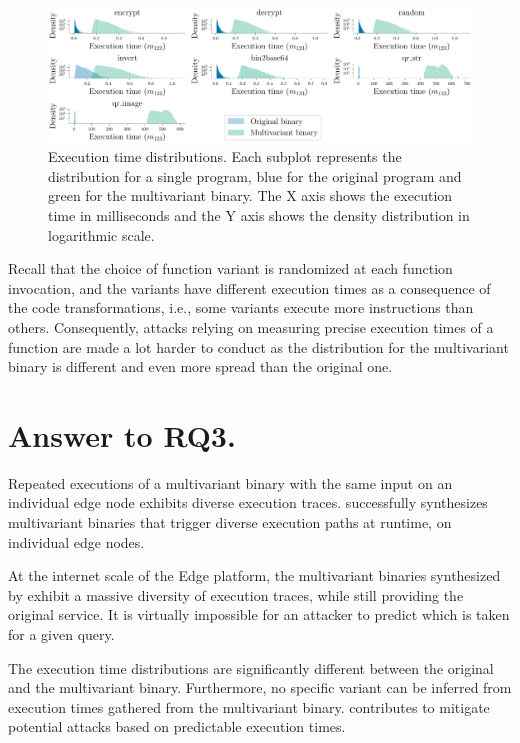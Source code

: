 \begin{figure}[h]
    \includegraphics[width=\linewidth]{plots/times.pdf}
    \caption{Execution time distributions. Each subplot represents the distribution for a single program, blue for the original program and green for the multivariant binary. The X axis shows the execution time in milliseconds and the Y axis shows the density distribution in logarithmic scale.}
    \label{rq3:diversity:times}
\end{figure}


Recall that the choice of function variant is randomized at each function invocation, and the variants have different execution times as a consequence of the code transformations, i.e., some variants execute more instructions than others. 
Consequently, attacks relying on measuring precise execution times of a function are made a lot harder to conduct as the distribution for the multivariant binary is different and even more spread than the original one.

\section{Answer to RQ3.}


Repeated executions of a multivariant binary with the same input on an individual edge node exhibits diverse execution traces.
\tool successfully synthesizes multivariant binaries that trigger diverse execution paths at runtime, on individual edge nodes. 


At the internet scale of the Edge platform, the multivariant binaries synthesized by \tool exhibit a massive diversity of execution traces, while still providing the original service.
It is virtually impossible for an attacker to predict which is taken for a given query.



The execution time distributions are significantly different between the original and the multivariant binary. Furthermore, no specific variant can be inferred from execution times gathered from the multivariant binary. \tool contributes to mitigate potential attacks based on predictable execution times.